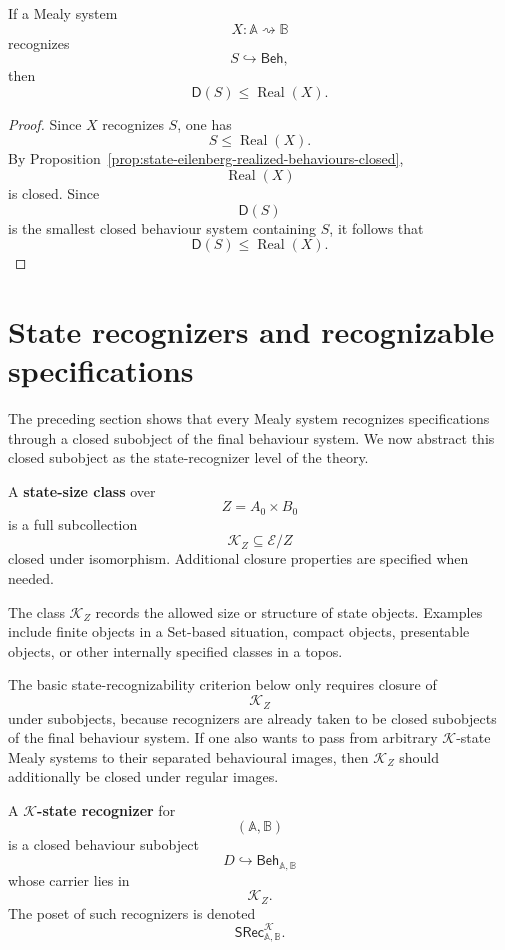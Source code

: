 \begin{corollary}
\label{cor:state-eilenberg-recognition-implies-closure-contained}
If a Mealy system
\[
X:\mathbb A\rightsquigarrow\mathbb B
\]
recognizes
\[
S\hookrightarrow\mathsf{Beh},
\]
then
\[
\mathsf D(S)\leq \operatorname{Real}(X).
\]
\end{corollary}

\begin{proof}
Since \(X\) recognizes \(S\), one has
\[
S\leq\operatorname{Real}(X).
\]
By Proposition~\ref{prop:state-eilenberg-realized-behaviours-closed},
\[
\operatorname{Real}(X)
\]
is closed. Since
\[
\mathsf D(S)
\]
is the smallest closed behaviour system containing \(S\), it follows that
\[
\mathsf D(S)\leq\operatorname{Real}(X).
\]
\end{proof}

\section{State recognizers and recognizable specifications}
\label{sec:state-eilenberg-state-recognizers}

The preceding section shows that every Mealy system recognizes specifications
through a closed subobject of the final behaviour system. We now abstract this
closed subobject as the state-recognizer level of the theory.

\begin{definition}
\label{def:state-eilenberg-state-size-class}
A \textbf{state-size class} over
\[
Z=A_0\times B_0
\]
is a full subcollection
\[
\mathcal K_Z\subseteq\mathcal E/Z
\]
closed under isomorphism. Additional closure properties are specified when
needed.
\end{definition}

The class \(\mathcal K_Z\) records the allowed size or structure of state
objects. Examples include finite objects in a Set-based situation, compact
objects, presentable objects, or other internally specified classes in a
topos.

The basic state-recognizability criterion below only requires closure of
\[
\mathcal K_Z
\]
under subobjects, because recognizers are already taken to be closed
subobjects of the final behaviour system. If one also wants to pass from
arbitrary \(\mathcal K\)-state Mealy systems to their separated behavioural
images, then \(\mathcal K_Z\) should additionally be closed under regular
images.

\begin{definition}
\label{def:state-eilenberg-K-state-recognizer}
A \textbf{\(\mathcal K\)-state recognizer} for
\[
(\mathbb A,\mathbb B)
\]
is a closed behaviour subobject
\[
D\hookrightarrow\mathsf{Beh}_{\mathbb A,\mathbb B}
\]
whose carrier lies in
\[
\mathcal K_Z.
\]
The poset of such recognizers is denoted
\[
\mathsf{SRec}^{\mathcal K}_{\mathbb A,\mathbb B}.
\]
\end{definition}

